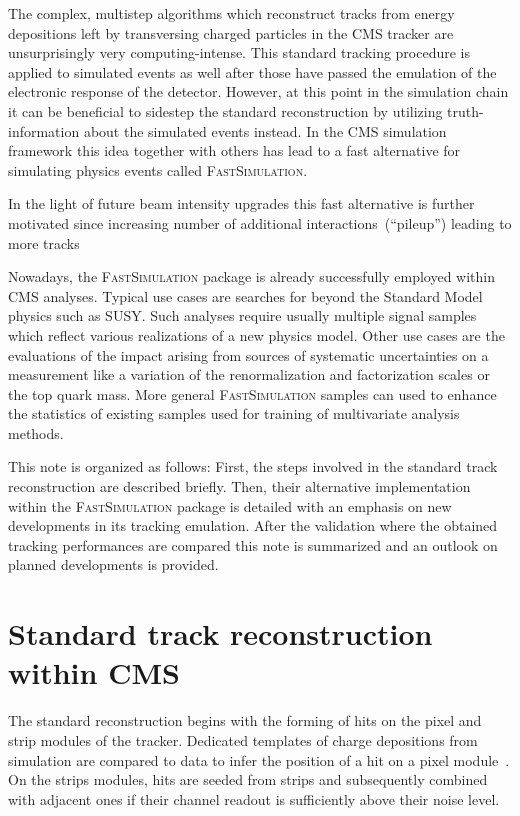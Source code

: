 \documentclass[a4paper]{jpconf}
\begin{document}
The complex, multistep algorithms which reconstruct tracks from energy depositions left by transversing charged particles in the CMS tracker are unsurprisingly very computing-intense. This standard tracking procedure is applied to simulated events as well after those have passed the emulation of the electronic response of the detector. However, at this point in the simulation chain it can be beneficial to sidestep the standard reconstruction by utilizing truth-information about the simulated events instead. In the CMS simulation framework this idea together with others has lead to a fast alternative for simulating physics events called \textsc{FastSimulation}. 

In the light of future beam intensity upgrades this fast alternative is further motivated since increasing number of additional interactions~(``pileup'') leading to more tracks 

Nowadays, the \textsc{FastSimulation} package is already successfully employed within CMS analyses. Typical use cases are searches for beyond the Standard Model physics such as SUSY. Such analyses require usually multiple signal samples which reflect various realizations of a new physics model. Other use cases are the evaluations of the impact arising from sources of systematic uncertainties on a measurement like a variation of the renormalization and factorization scales or the top quark mass. More general \textsc{FastSimulation} samples can used to enhance the statistics of existing samples used for training of multivariate analysis methods.

This note is organized as follows: First, the steps involved in the standard track reconstruction are described briefly. Then, their alternative implementation within the \textsc{FastSimulation} package is detailed with an emphasis on new developments in its tracking emulation. After the validation where the obtained tracking performances are compared this note is summarized and an outlook on planned developments is provided.


\section{Standard track reconstruction within CMS}

The standard reconstruction begins with the forming of hits on the pixel and strip modules of the tracker. Dedicated templates of charge depositions from simulation are compared to data to infer the position of a hit on a pixel module~\cite{pixelav}. On the strips modules, hits are seeded from strips and subsequently combined with adjacent ones if their channel readout is sufficiently above their noise level.
\end{document}
